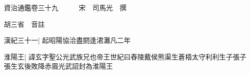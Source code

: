






























































資治通鑑卷三十九　　　宋　司馬光　撰

胡三省　音註

漢紀三十一|{
	起昭陽協洽盡閼逢涒灘凡二年}


淮陽王|{
	諱玄字聖公光武族兄也帝王世紀曰舂陵戴侯熊渠生蒼梧太守利利生子張子張生玄後敗降赤眉光武詔封為淮陽王}


